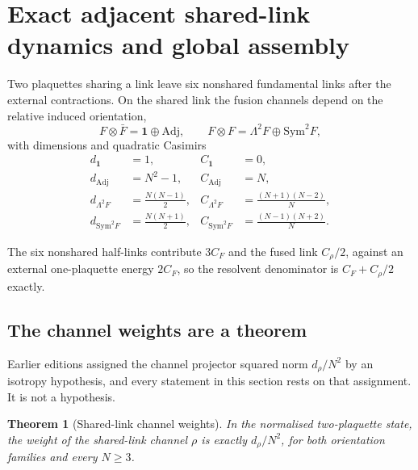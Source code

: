 \documentclass[11pt]{article}
\theoremstyle{plain}
\newtheorem{theorem}{Theorem}
\theoremstyle{definition}
\theoremstyle{remark}
\newcommand{\chk}[1]{}
\newcommand{\CF}{C_F}
\begin{document}
\section{Exact adjacent shared-link dynamics and global assembly}
\label{sec:second}

Two plaquettes sharing a link leave six nonshared fundamental links after the
external contractions. On the shared link the fusion channels depend on the
relative induced orientation,
\begin{equation}\label{eq:fusion}
  F\otimes\bar F=\mathbf{1}\oplus\mathrm{Adj},
  \qquad
  F\otimes F=\Lambda^2F\oplus\mathrm{Sym}^2F ,
\end{equation}
with dimensions and quadratic Casimirs
\begin{equation}\label{eq:table}
\begin{aligned}
  d_{\mathbf 1}&=1, & C_{\mathbf 1}&=0,\\
  d_{\mathrm{Adj}}&=N^2-1, & C_{\mathrm{Adj}}&=N,\\
  d_{\Lambda^2F}&=\tfrac{N(N-1)}2, & C_{\Lambda^2F}&=\tfrac{(N+1)(N-2)}N,\\
  d_{\mathrm{Sym}^2F}&=\tfrac{N(N+1)}2, & C_{\mathrm{Sym}^2F}&=\tfrac{(N-1)(N+2)}N.
\end{aligned}
\end{equation}

The six nonshared half-links contribute $3\CF$ and the fused link $C_\rho/2$,
against an external one-plaquette energy $2\CF$, so the resolvent denominator
is $\CF+C_\rho/2$ exactly.
\chk{each channel gap is C\_F + C\_R/2, and the weights sum to one}

\subsection{The channel weights are a theorem}

Earlier editions assigned the channel projector squared norm $d_\rho/N^2$ by
an isotropy hypothesis, and every statement in this section rests on that
assignment. It is not a hypothesis.

\begin{theorem}[Shared-link channel weights]\label{thm:weingarten}
In the normalised two-plaquette state, the weight of the shared-link channel
$\rho$ is exactly $d_\rho/N^2$, for both orientation families and every
$N\ge3$.
\end{theorem}
\end{document}
